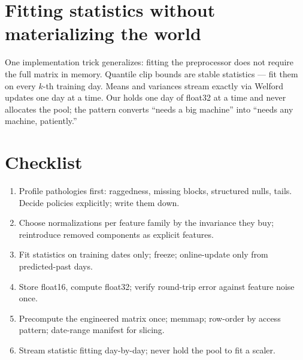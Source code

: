 \section{Fitting statistics without materializing the world}

One implementation trick generalizes: fitting the preprocessor does not
require the full matrix in memory. Quantile clip bounds are stable
statistics --- fit them on every $k$-th training day. Means and variances
stream exactly via Welford updates one day at a time. Our
 holds one day of float32 at a time and
never allocates the pool; the pattern converts ``needs a big machine'' into
``needs any machine, patiently.''

\section{Checklist}

\begin{enumerate}
\item Profile pathologies first: raggedness, missing blocks, structured
  nulls, tails. Decide policies explicitly; write them down.
\item Choose normalizations per feature family by the invariance they buy;
  reintroduce removed components as explicit features.
\item Fit statistics on training dates only; freeze; online-update only
  from predicted-past days.
\item Store float16, compute float32; verify round-trip error against
  feature noise once.
\item Precompute the engineered matrix once; memmap; row-order by access
  pattern; date-range manifest for slicing.
\item Stream statistic fitting day-by-day; never hold the pool to fit a
  scaler.
\end{enumerate}
